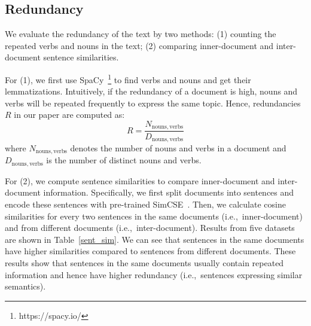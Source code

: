 \documentclass[11pt]{article}
\begin{document}
\subsection{Redundancy}
\label{app:redundacy}
\begin{table}[t]
    
    \caption{Information redundancies for different lengths (i.e.,~word numbers) of text: (1) 0-50 (2) 51-100 (3) 101-200 (4) 201-300 (5) more than 300.}
    \label{redundancy}
\end{table}

We evaluate the redundancy of the text by two methods: (1) counting the repeated verbs and nouns in the text; (2) comparing inner-document and inter-document sentence similarities.

For (1), we first use SpaCy~\footnote{https://spacy.io/} to find verbs and nouns and get their lemmatizations. Intuitively, if the redundancy of a document is high, nouns and verbs will be repeated frequently to express the same topic. Hence, redundancies $R$ in our paper are computed as:
\begin{equation}
    R = \frac{N_{\mathrm{nouns, verbs}}}{D_{\mathrm{nouns, verbs}}}
\end{equation}
where $N_{\mathrm{nouns, verbs}}$ denotes the number of nouns and verbs in a document and $D_{\mathrm{nouns, verbs}}$ is the number of distinct nouns and verbs.

For (2), we compute sentence similarities to compare inner-document and inter-document information. Specifically, we first split documents into sentences and encode these sentences with pre-trained SimCSE~\cite{Gao2021SimCSESC}. Then, we calculate cosine similarities for every two sentences in the same documents (i.e.,~inner-document) and from different documents (i.e.,~inter-document). Results from five datasets are shown in Table~\ref{sent_sim}. We can see that sentences in the same documents have higher similarities compared to sentences from different documents. These results show that sentences in the same documents usually contain repeated information and hence have higher redundancy (i.e.,~sentences expressing similar semantics).

\label{app:sent_sim}
\begin{table}[t]
    
    \caption{Inner-document and inter-document sentences similarities measured by SimCSE.}
    \label{sent_sim}
\end{table}
\end{document}
